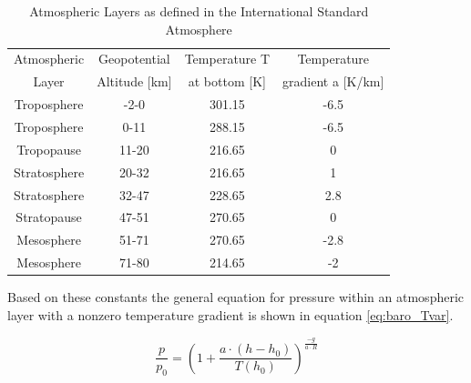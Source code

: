 \begin{table}[h]
    \centering
    \caption[International Standard Atmosphere Layers\cite{zhang_bibliographical_2008}]{Atmospheric Layers as defined in the International Standard Atmosphere \cite{iso_standard_1975}}

    \begin{tabular}{@{}cccc@{}}
        \toprule
        Atmospheric  & Geopotential      & Temperature T     & Temperature           \\
        Layer        & Altitude {[}km{]} & at bottom {[}K{]} & gradient a {[}K/km{]} \\ \midrule
        Troposphere  & -2-0              & 301.15            & -6.5                  \\
        Troposphere  & 0-11              & 288.15            & -6.5                  \\
        Tropopause   & 11-20             & 216.65            & 0                     \\
        Stratosphere & 20-32             & 216.65            & 1                     \\
        Stratosphere & 32-47             & 228.65            & 2.8                   \\
        Stratopause  & 47-51             & 270.65            & 0                     \\
        Mesosphere   & 51-71             & 270.65            & -2.8                  \\
        Mesosphere   & 71-80             & 214.65            & -2                    \\ \bottomrule
    \end{tabular}
    \label{tab:isa_temp}
\end{table}

Based on these constants the general equation for pressure within an atmospheric layer with a nonzero temperature gradient is shown in equation \ref{eq:baro_Tvar}. \cite{iso_standard_1975}

\begin{equation}
    \frac{p}{p_0}=\left(1+\frac{a \cdot\left(h-h_0\right)}{T\left(h_0\right)}\right)^{\frac{-g}{a \cdot R}}
    \label{eq:baro_Tvar}
\end{equation}

